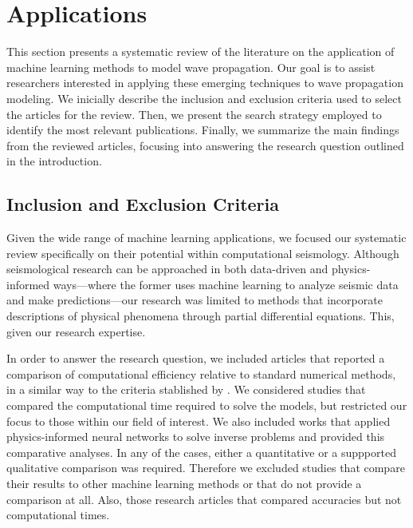 \documentclass[11pt,twoside]{article}
\begin{document}
\section{Applications}\label{sec:applications}

This section presents a systematic review of the literature on the application of machine learning methods to model 
wave propagation. Our goal is to assist researchers interested in applying these emerging techniques to wave propagation 
modeling. We inicially describe the inclusion and exclusion criteria used to select the articles for the review. 
Then, we present the search strategy employed to identify the most relevant publications. Finally, we summarize the
main findings from the reviewed articles, focusing into answering the research question outlined in the introduction.

\subsection*{Inclusion and Exclusion Criteria}

Given the wide range of machine learning applications, we focused our systematic review specifically on their potential 
within computational seismology. Although seismological research can be approached in both data-driven and physics-informed 
ways—where the former uses machine learning to analyze seismic data and make predictions—our research was limited to 
methods that incorporate descriptions of physical phenomena through partial differential equations. This, given our
research expertise. 

In order to answer the research question, we included articles that reported a comparison of 
computational efficiency relative to standard numerical methods, in a similar way to the criteria stablished by 
. We considered studies that compared the computational time 
required to solve the models, but restricted our focus to those within our field of interest. We also included works that 
applied physics-informed neural networks to solve inverse problems and provided this comparative analyses. In any of the 
cases, either a quantitative or a suppported qualitative comparison was required. Therefore we excluded studies that compare 
their results to other machine learning methods or that do not provide a comparison at all. Also, those research
articles that compared accuracies but not computational times.   
\end{document}
